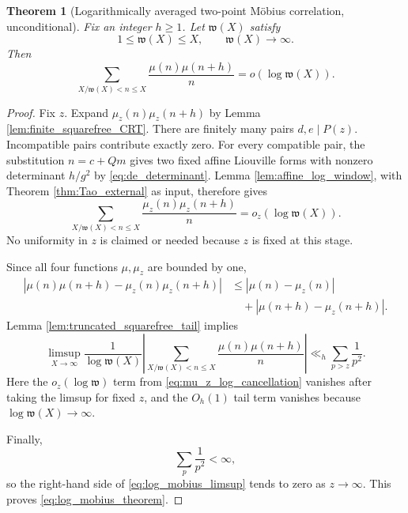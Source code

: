 \documentclass[11pt]{amsart}
\numberwithin{equation}{section}
\theoremstyle{plain}
\newtheorem{theorem}{Theorem}[section]
\theoremstyle{definition}
\theoremstyle{remark}
\newcommand{\mob}{\mu}
\newcommand{\what}{\mathfrak w}
\begin{document}
\begin{theorem}[Logarithmically averaged two-point Möbius correlation, unconditional]
\label{thm:log_mobius}
Fix an integer $h\ge1$.  Let $\what(X)$ satisfy
\begin{equation}
1\le\what(X)\le X,
\qquad
\what(X)\longrightarrow\infty.
\label{eq:omega_conditions}
\end{equation}
Then
\begin{equation}
\boxed{
\sum_{X/\what(X)<n\le X}
\frac{\mob(n)\mob(n+h)}{n}
=o(\log\what(X)).}
\label{eq:log_mobius_theorem}
\end{equation}
\end{theorem}

\begin{proof}
Fix $z$.  Expand $\mob_z(n)\mob_z(n+h)$ by Lemma \ref{lem:finite_squarefree_CRT}.  There are finitely many pairs $d,e\mid P(z)$.  Incompatible pairs contribute exactly zero.  For every compatible pair, the substitution $n=c+Qm$ gives two fixed affine Liouville forms with nonzero determinant $h/g^2$ by \eqref{eq:de_determinant}.  Lemma \ref{lem:affine_log_window}, with Theorem \ref{thm:Tao_external} as input, therefore gives
\begin{equation}
\sum_{X/\what(X)<n\le X}
\frac{\mob_z(n)\mob_z(n+h)}{n}
=o_z(\log\what(X)).
\label{eq:mu_z_log_cancellation}
\end{equation}
No uniformity in $z$ is claimed or needed because $z$ is fixed at this stage.

Since all four functions $\mob,\mob_z$ are bounded by one,
\begin{align}
|\mob(n)\mob(n+h)-\mob_z(n)\mob_z(n+h)|
&\le |\mob(n)-\mob_z(n)|
\label{eq:product_difference_first}\\
&\quad+|\mob(n+h)-\mob_z(n+h)|.
\label{eq:product_difference_second}
\end{align}
Lemma \ref{lem:truncated_squarefree_tail} implies
\begin{equation}
\limsup_{X\to\infty}
\frac1{\log\what(X)}
\left|
\sum_{X/\what(X)<n\le X}
\frac{\mob(n)\mob(n+h)}n
\right|
\ll_h
\sum_{p>z}\frac1{p^2}.
\label{eq:log_mobius_limsup}
\end{equation}
Here the $o_z(\log\what)$ term from \eqref{eq:mu_z_log_cancellation} vanishes after taking the limsup for fixed $z$, and the $O_h(1)$ tail term vanishes because $\log\what(X)\to\infty$.

Finally,
\begin{equation}
\sum_p\frac1{p^2}<\infty,
\label{eq:prime_square_convergence}
\end{equation}
so the right-hand side of \eqref{eq:log_mobius_limsup} tends to zero as $z\to\infty$.  This proves \eqref{eq:log_mobius_theorem}.
\end{proof}
\end{document}
